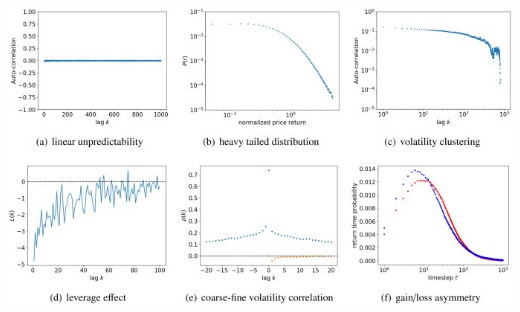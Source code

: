 \documentclass{article}
\begin{document}
    \begin{center}
        \includegraphics[scale = 0.7]{imgs/elisa/ts.jpg}
    \end{center}
\end{document}
